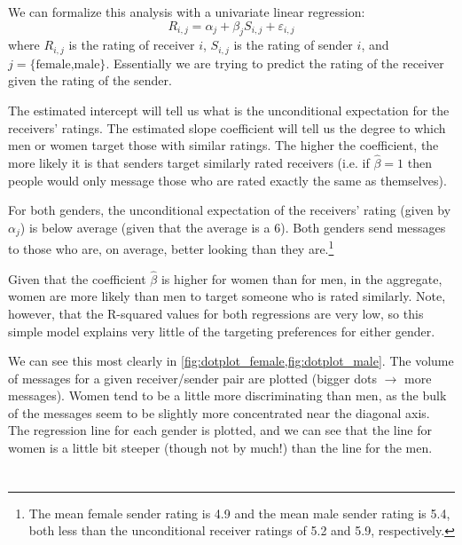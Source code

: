 We can formalize this analysis with a univariate linear regression:
\[ R_{i,j} = \alpha_j + \beta_j S_{i,j} + \varepsilon_{i,j} \]
where $R_{i,j}$ is the rating of receiver $i$, $S_{i,j}$ is the rating of sender $i$, and $j=\text{\{female,male\}}$. Essentially we are trying to predict the rating of the receiver given the rating of the sender.

The estimated intercept will tell us what is the unconditional expectation for the receivers' ratings. The estimated slope coefficient will tell us the degree to which men or women target those with similar ratings. The higher the coefficient, the more likely it is that senders target similarly rated receivers (i.e. if $\hat{\beta}=1$ then people would only message those who are rated exactly the same as themselves).



For both genders, the unconditional expectation of the receivers' rating (given by $\alpha_j$) is below average (given that the average is a 6). Both genders send messages to those who are, on average, better looking than they are.\footnote{The mean female sender rating is 4.9 and the mean male sender rating is 5.4, both less than the unconditional receiver ratings of 5.2 and 5.9, respectively.}

Given that the coefficient $\hat{\beta}$ is higher for women than for men, in the aggregate, women are more likely than men to target someone who is rated similarly. Note, however, that the R-squared values for both regressions are very low, so this simple model explains very little of the targeting preferences for either gender.

We can see this most clearly in \vref{fig:dotplot_female,fig:dotplot_male}. The volume of messages for a given receiver/sender pair are plotted (bigger dots $\rightarrow$ more messages). Women tend to be a little more discriminating than men, as the bulk of the messages seem to be slightly more concentrated near the diagonal axis. The regression line for each gender is plotted, and we can see that the line for women is a little bit steeper (though not by much!) than the line for the men.




\section{}

